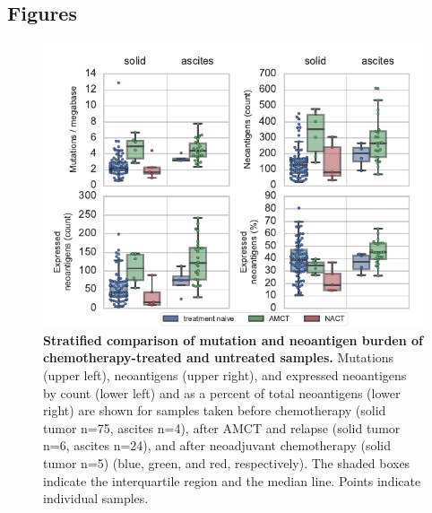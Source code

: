 \FloatBarrier

\subsection*{Figures}

\begin{figure}
\centering
\includegraphics[scale=1.0]{figures/counts.pdf}
\caption{\textbf{Stratified comparison of mutation and neoantigen burden of chemotherapy-treated and untreated samples.} Mutations (upper left), neoantigens (upper right), and expressed neoantigens by count (lower left) and as a percent of total neoantigens (lower right) are shown for samples taken before chemotherapy (solid tumor n=75, ascites n=4), after AMCT and relapse (solid tumor n=6, ascites n=24), and after neoadjuvant chemotherapy (solid tumor n=5) (blue, green, and red, respectively). The shaded boxes indicate the interquartile region and the median line. Points indicate individual samples.}
\label{fig:counts}
\end{figure}

